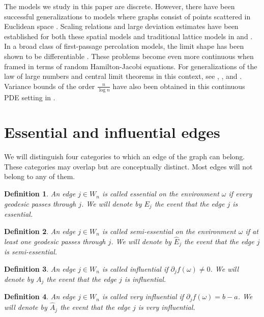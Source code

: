 \documentclass[reqno]{amsart}
\newtheorem{definition}{Definition}
\begin{document}
The models we study in this paper are discrete. However, there have been successful generalizations to models where graphs consist of points scattered in Euclidean space \cite{HowardNewman1997}. Scaling relations and large deviation estimates have been established for both these spatial models and traditional lattice models in \cite{BasuGangulySly2021} and \cite{BasuSidoraviciusSly2023}. In a broad class of first-passage percolation models, the limit shape has been shown to be differentiable \cite{BakhtinDow2024}.
These problems become even more continuous when framed in terms of random Hamilton-Jacobi equations. For generalizations of the law of large numbers and central limit theorems in this context, see \cite{RezakhanlouTarver2000}, \cite{ArmstrongCardaliaguetSouganidis2014}, and \cite{DaviniKosyginaYilmaz2023}. Variance bounds of the order $\frac{n}{\log n}$ have also been obtained in this continuous PDE setting in \cite{MaticNolen2012}.




\section{Essential and influential edges}
We will distinguish four categories to which an edge of the graph can belong. These categories may overlap but are conceptually distinct. Most edges will not belong to any of them. 

\begin{definition} \label{def|Essential} An edge $j\in W_n$ is called {\em essential} on the environment $\omega$ if every geodesic passes through $j$. We will denote by $E_j$ the event that the edge $j$ is essential. 
\end{definition}

\begin{definition} \label{def|SemiEssential} An edge $j\in W_n$ is called {\em semi-essential} on the environment $\omega$ if at least one geodesic passes through $j$. We will denote by $\hat E_j$ the event that the edge $j$ is semi-essential. 
\end{definition}


\begin{definition} \label{def|Influential} An edge $j\in W_n$ is called {\em influential} if $\partial_jf(\omega)\neq 0$. We will denote by $A_j$ the event that the edge $j$ is influential. 
\end{definition}



\begin{definition} \label{def|VeryInfluential} An edge $j\in W_n$ is called {\em very influential} if $\partial_jf(\omega)= b-a$. We will denote by $\hat A_j$ the event that the edge $j$ is very influential. 
\end{definition} 
\end{document}
